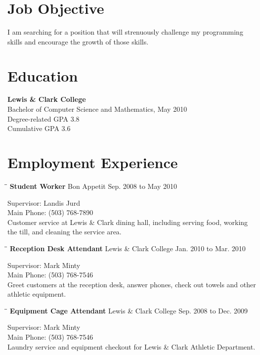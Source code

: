 \documentclass{res}
\newcommand{\employment}[6]{\vspace{-0.1in}\begin{tabbing}\hspace{2.3in}\= \hspace{2.6in}\= \kill
    \textbf{#1} \>#2     \>#3\\
                             \end{tabbing}\vspace{-20pt}
                             Supervisor: #4\\
                            Main Phone: #5\\
                             #6}
\begin{document}
 


\address{\bf  PRESENT ADDRESS\\0615 SW Palatine Hill Rd.\\Portland, OR 97219\\(503) 887-4920}
\address{\bf PERMANENT ADDRESS \\ 556 NW Trenton Avenue \\Bend, OR 97701 \\  (541) 312-8219}
                                  
\begin{resume}

\section{Job Objective}
    I am searching for a position that will strenuously challenge my programming
    skills and encourage the growth of those skills.
 
\section{Education}          
    \textbf{Lewis \& Clark College} \\
    Bachelor of Computer Science and Mathematics, May 2010 \\
    Degree-related GPA 3.8 \\
    Cumulative GPA 3.6 \\
 
\section{Employment Experience}
    \employment{Student Worker}{Bon Appetit}{Sep. 2008 to
    May 2010}{Landis Jurd}{(503) 768-7890}{Customer service at Lewis \& Clark
    dining hall, including serving food, working the till, and cleaning the
    service area.}

    \employment{Reception Desk Attendant}{Lewis \& Clark College}{Jan. 2010 to
    Mar. 2010}{Mark Minty}{(503) 768-7546}{Greet customers at the reception
    desk, answer phones, check out towels and other athletic equipment.}

    \employment{Equipment Cage Attendant}{Lewis \& Clark College}{Sep. 2008
    to Dec. 2009}{Mark Minty}{(503) 768-7546}{Laundry service and equipment
    checkout for Lewis \& Clark Athletic Department.}


\end{resume}
\end{document}
